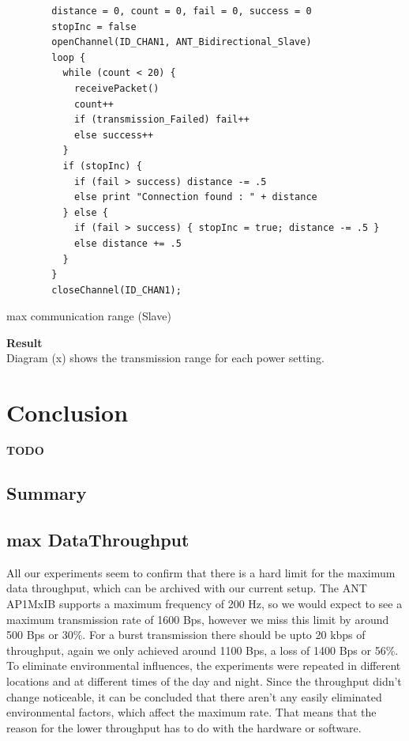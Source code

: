 \begin{description}
	\begin{code}
		\begin{verbatim}
		distance = 0, count = 0, fail = 0, success = 0
		stopInc = false
		openChannel(ID_CHAN1, ANT_Bidirectional_Slave)
		loop {
		  while (count < 20) {
		    receivePacket()
		    count++
		    if (transmission_Failed) fail++
		    else success++
		  }
		  if (stopInc) { 
		    if (fail > success) distance -= .5
		    else print "Connection found : " + distance
		  } else {
		    if (fail > success) { stopInc = true; distance -= .5 }
		    else distance += .5
		  }
		}
		closeChannel(ID_CHAN1);		
		\end{verbatim}
		\caption{max communication range (Slave)}\label{lst:sExp6}
	\end{code}
	
	
	\item{\textbf{Result}} \hfill \\ Diagram (x) shows the transmission range for each power setting. 
\end{description}
\newpage


\chapter{Conclusion}
\textbf{TODO}
\section{Summary}

\section{max DataThroughput}
\label{sec:dataThrougput}

All our experiments seem to confirm that there is a hard limit for the maximum data throughput, which can be archived with our current setup. The ANT AP1MxIB supports a maximum frequency of 200 Hz, so we would expect to see a maximum transmission rate of 1600 Bps, however we miss this limit by around 500 Bps or 30\%. For a burst transmission there should be upto 20 kbps of throughput, again we only achieved around 1100 Bps, a loss of 1400 Bps or 56\%.\\
To eliminate environmental influences, the experiments were repeated in different locations and at different times of the day and night. Since the throughput didn't change noticeable, it can be concluded that there aren't any easily eliminated environmental factors, which affect the maximum rate. That means that the reason for the lower throughput has to do with the hardware or software. \\

